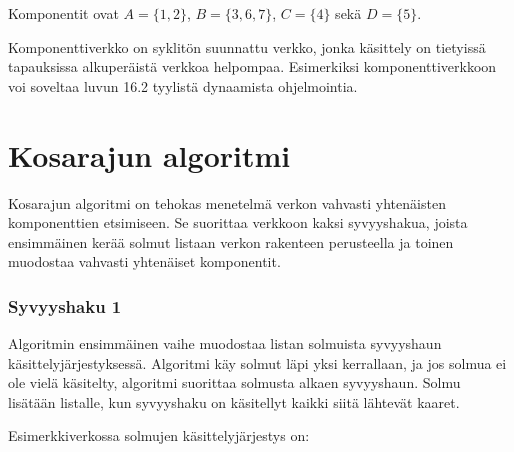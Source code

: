 Komponentit ovat $A=\{1,2\}$,
$B=\{3,6,7\}$, $C=\{4\}$ sekä $D=\{5\}$.

Komponenttiverkko on syklitön suunnattu verkko,
jonka käsittely on tietyissä tapauksissa
alkuperäistä verkkoa helpompaa.
Esimerkiksi komponenttiverkkoon voi soveltaa
luvun 16.2 tyylistä dynaamista ohjelmointia.

\section{Kosarajun algoritmi}

Kosarajun algoritmi on tehokas
menetelmä verkon
vahvasti yhtenäisten komponenttien etsimiseen.
Se suorittaa verkkoon
kaksi syvyyshakua, joista ensimmäinen
kerää solmut listaan verkon rakenteen perusteella
ja toinen muodostaa vahvasti yhtenäiset komponentit.

\subsubsection{Syvyyshaku 1}

Algoritmin ensimmäinen vaihe muodostaa listan solmuista
syvyyshaun käsittelyjärjestyksessä.
Algoritmi käy solmut läpi yksi kerrallaan,
ja jos solmua ei ole vielä käsitelty, algoritmi suorittaa
solmusta alkaen syvyyshaun.
Solmu lisätään listalle, kun syvyyshaku on 
käsitellyt kaikki siitä lähtevät kaaret.

Esimerkkiverkossa solmujen käsittelyjärjestys on:
\begin{center}
\end{center}

